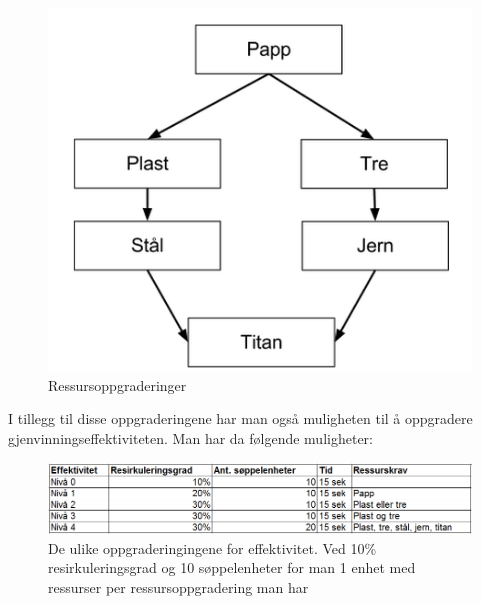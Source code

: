 	\begin{figure} [H]
				\begin{center}
					\includegraphics[scale=0.5]{images/oppgraderingstre}
				\end{center}
			\caption{Ressursoppgraderinger}
	\end{figure}
		
I tillegg til disse oppgraderingene har man også muligheten til å oppgradere gjenvinningseffektiviteten. Man har da følgende muligheter: \\

		\begin{figure} [H]
				\begin{center}
					\includegraphics[scale=0.5]{images/effektivitet}
				\end{center}
			\caption{De ulike oppgraderingingene for effektivitet. Ved 10\% resirkuleringsgrad og 10 søppelenheter for man 1 enhet med ressurser per ressursoppgradering man har}
		\end{figure}



